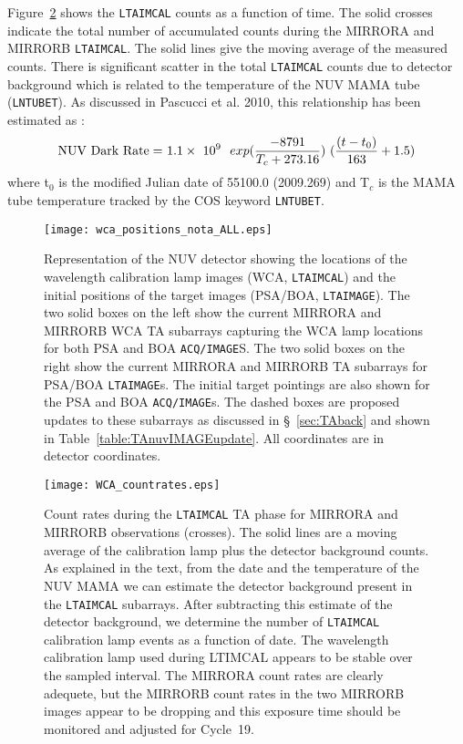 \documentclass[12pt]{article}
\begin{document}
Figure~\ref{LTAIMCALrates} shows the \texttt{LTAIMCAL} counts as a function of time.
The solid crosses indicate the total number of accumulated counts during the {\color{green}MIRRORA}
and {\color{blue}MIRRORB} \texttt{LTAIMCAL}. The solid lines give the moving average of the measured counts.
There is significant scatter in the total \texttt{LTAIMCAL} counts due to detector background which
is related to the temperature of the NUV MAMA tube (\texttt{LNTUBET}). As discussed in
Pascucci et al. 2010, this relationship has been estimated as :
 \begin{equation}\label{eq:NUVcps}
 	{\rm NUV~Dark~Rate =}~ 1.1\times~10^9~~exp({{-8791}\over{T_c + 273.16}})~({{(t-t_0)}\over{163}} + 1.5)
 \end{equation}
where t$_0$ is the modified Julian date of 55100.0 (2009.269) and T$_c$ is the MAMA tube temperature tracked by the
COS keyword \texttt{LNTUBET}.
\begin{figure}[b]
\center
\texttt{[image: wca\_positions\_nota\_ALL.eps]}
\caption[WCA \texttt{LTAIMCAL} Positions]{\small Representation of the NUV detector showing the locations of the wavelength
calibration lamp images (WCA, \texttt{LTAIMCAL}) and the initial positions of the target images (PSA/BOA, \texttt{LTAIMAGE}).
The two solid boxes on the left show the current MIRRORA and MIRRORB WCA TA subarrays capturing the WCA lamp locations for both {\color{magenta}PSA} and {\color{blue}BOA} \texttt{ACQ/IMAGE}S. The two solid boxes on the right show the
current MIRRORA and MIRRORB TA subarrays for PSA/BOA \texttt{LTAIMAGE}s. The initial target pointings are also shown
for the {\color{magenta}PSA} and {\color{blue}BOA} \texttt{ACQ/IMAGE}s. The dashed boxes are proposed updates to these subarrays as discussed in \S~\ref{sec:TAback} and shown in Table~\ref{table:TAnuvIMAGEupdate}. All coordinates are in detector coordinates.\label{LTAIMCALpos}}
\end{figure}

\begin{figure}[b]
\center
\texttt{[image: WCA\_countrates.eps]}
\caption[WCA \texttt{LTAIMCAL} Counts]{\small Count rates during the \texttt{LTAIMCAL} TA phase for {\color{green}MIRRORA}
and {\color{blue}MIRRORB} observations (crosses). The solid lines are a moving average of the calibration lamp plus the detector background counts.
As explained in the text, from the date and the temperature of the NUV MAMA we can estimate the detector background present
in the \texttt{LTAIMCAL} subarrays. After subtracting this estimate of the detector background,
we determine the number of \texttt{LTAIMCAL} calibration lamp events as a function of date.
The wavelength calibration lamp used during LTIMCAL appears to be stable over the sampled interval.
The {\color{green}MIRRORA} count rates  are clearly adequete, but the {\color{blue}MIRRORB} count rates
in the two {\color{blue}MIRRORB} images appear to be dropping and this exposure time should be monitored and adjusted for Cycle~19.\label{LTAIMCALrates}}
\end{figure}
\end{document}
